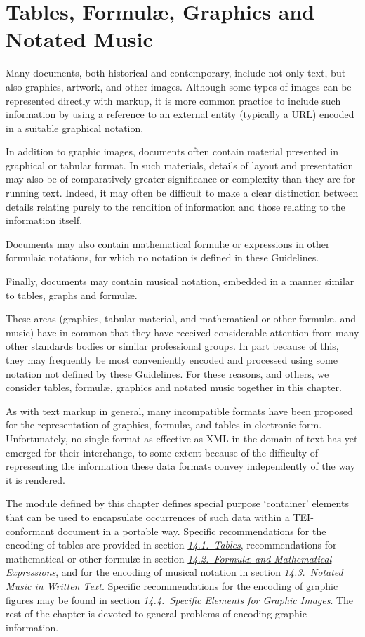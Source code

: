 
\section[{Tables, Formulæ, Graphics and Notated Music}]{Tables, Formulæ, Graphics and Notated Music}\label{FT}\par
Many documents, both historical and contemporary, include not only text, but also graphics, artwork, and other images. Although some types of images can be represented directly with markup, it is more common practice to include such information by using a reference to an external entity (typically a URL) encoded in a suitable graphical notation.\par
In addition to graphic images, documents often contain material presented in graphical or tabular format. In such materials, details of layout and presentation may also be of comparatively greater significance or complexity than they are for running text. Indeed, it may often be difficult to make a clear distinction between details relating purely to the rendition of information and those relating to the information itself.\par
Documents may also contain mathematical formulæ or expressions in other formulaic notations, for which no notation is defined in these Guidelines.\par
Finally, documents may contain musical notation, embedded in a manner similar to tables, graphs and formulæ.\par
These areas (graphics, tabular material, and mathematical or other formulæ, and music) have in common that they have received considerable attention from many other standards bodies or similar professional groups. In part because of this, they may frequently be most conveniently encoded and processed using some notation not defined by these Guidelines. For these reasons, and others, we consider tables, formulæ, graphics and notated music together in this chapter.\par
As with text markup in general, many incompatible formats have been proposed for the representation of graphics, formulæ, and tables in electronic form. Unfortunately, no single format as effective as XML in the domain of text has yet emerged for their interchange, to some extent because of the difficulty of representing the information these data formats convey independently of the way it is rendered.\par
The module defined by this chapter defines special purpose ‘container’ elements that can be used to encapsulate occurrences of such data within a TEI-conformant document in a portable way. Specific recommendations for the encoding of tables are provided in section \textit{\hyperref[FTTAB]{14.1.\ Tables}}, recommendations for mathematical or other formulæ in section \textit{\hyperref[FTFOR]{14.2.\ Formulæ and Mathematical Expressions}}, and for the encoding of musical notation in section \textit{\hyperref[FTNM]{14.3.\ Notated Music in Written Text}}. Specific recommendations for the encoding of graphic figures may be found in section \textit{\hyperref[FTGRA]{14.4.\ Specific Elements for Graphic Images}}. The rest of the chapter is devoted to general problems of encoding graphic information.\par
